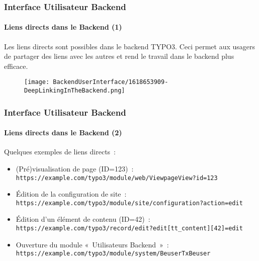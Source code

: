 %

\begin{frame}[fragile]
	\frametitle{Interface Utilisateur Backend}
	\framesubtitle{Liens directs dans le Backend (1)}

	Les liens directs sont possibles dans le backend TYPO3. Ceci permet aux usagers
	de partager des liens avec les autres et rend le travail dans le backend plus efficace.

	\begin{figure}
		\texttt{[image: BackendUserInterface/1618653909-DeepLinkingInTheBackend.png]}
	\end{figure}

\end{frame}


\begin{frame}[fragile]
	\frametitle{Interface Utilisateur Backend}
	\framesubtitle{Liens directs dans le Backend (2)}

	Quelques exemples de liens directs~:
	\vspace{0.2cm}
	\begin{itemize}
		\item (Pré)visualisation de page (ID=123)~:\newline
			\fontsize{8}{10}\texttt{https://example.com/typo3/module/web/ViewpageView?id=123}\normalsize
		\item Édition de la configuration de site~:
			\fontsize{8}{10}\texttt{https://example.com/typo3/module/site/configuration?action=edit}\normalsize
		\item Édition d'un élément de contenu (ID=42)~:
			\fontsize{8}{10}\texttt{https://example.com/typo3/record/edit?edit[tt\_content][42]=edit}\normalsize
		\item Ouverture du module «~Utilisateurs Backend~»~:
			\fontsize{8}{10}\texttt{https://example.com/typo3/module/system/BeuserTxBeuser}\normalsize
	\end{itemize}

\end{frame}

